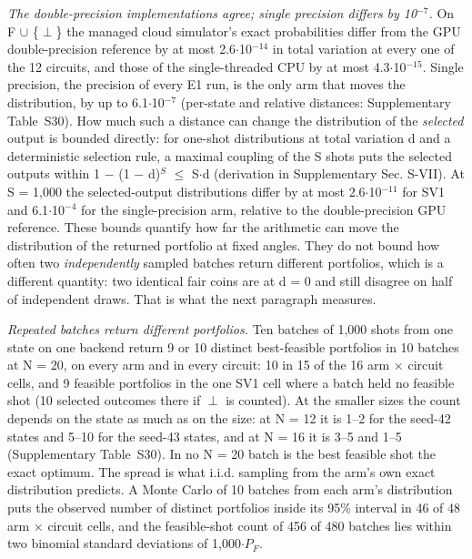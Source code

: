 \documentclass[journal]{IEEEtran}
\begin{document}
\textit{The double-precision implementations agree; single precision differs by 10$^{-7}$.} On F $\cup$ \{$\perp$\} the managed cloud simulator's exact probabilities differ from the GPU double-precision reference by at most 2.6$\cdot$10$^{-14}$ in total variation at every one of the 12 circuits, and those of the single-threaded CPU by at most 4.3$\cdot$10$^{-15}$. Single precision, the precision of every E1 run, is the only arm that moves the distribution, by up to 6.1$\cdot$10$^{-7}$ (per-state and relative distances: Supplementary Table~S30). How much such a distance can change the distribution of the \textit{selected} output is bounded directly: for one-shot distributions at total variation d and a deterministic selection rule, a maximal coupling of the S shots puts the selected outputs within 1 $-$ (1 $-$ d)$^{S}$ $\leq$ S$\cdot$d (derivation in Supplementary Sec. S-VII). At S = 1,000 the selected-output distributions differ by at most 2.6$\cdot$10$^{-11}$ for SV1 and 6.1$\cdot$10$^{-4}$ for the single-precision arm, relative to the double-precision GPU reference. These bounds quantify how far the arithmetic can move the distribution of the returned portfolio at fixed angles. They do not bound how often two \textit{independently} sampled batches return different portfolios, which is a different quantity: two identical fair coins are at d = 0 and still disagree on half of independent draws. That is what the next paragraph measures.


\textit{Repeated batches return different portfolios.} Ten batches of 1,000 shots from one state on one backend return 9 or 10 distinct best-feasible portfolios in 10 batches at N = 20, on every arm and in every circuit: 10 in 15 of the 16 arm $\times$ circuit cells, and 9 feasible portfolios in the one SV1 cell where a batch held no feasible shot (10 selected outcomes there if $\perp$ is counted). At the smaller sizes the count depends on the state as much as on the size: at N = 12 it is 1--2 for the seed-42 states and 5--10 for the seed-43 states, and at N = 16 it is 3--5 and 1--5 (Supplementary Table~S30). In no N = 20 batch is the best feasible shot the exact optimum. The spread is what i.i.d. sampling from the arm's own exact distribution predicts. A Monte Carlo of 10 batches from each arm's distribution puts the observed number of distinct portfolios inside its 95\% interval in 46 of 48 arm $\times$ circuit cells, and the feasible-shot count of 456 of 480 batches lies within two binomial standard deviations of 1,000$\cdot$$P_{F}$.
\end{document}
